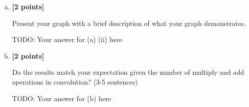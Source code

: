 \begin{enumerate}[(a)]
\begin{tcolorbox}[enhanced jigsaw,breakable,pad at break*=1mm,colback=white!5!white,colframe=green!75!black]
\begin{python}
\end{python}
\end{tcolorbox}
    
    
    \item \textbf{[2 points]}
    \begin{tcolorbox}[colback=orange!5!white,colframe=orange!75!black]
    Present your graph with a brief description of what your graph demonstrates.
    \end{tcolorbox}

\begin{tcolorbox}[colback=white!5!white,colframe=green!75!black]
    \begin{mdframed}
        TODO: Your answer for (a) (ii) here
    \end{mdframed}
\end{tcolorbox}
    

\item \textbf{[2 points]} 
\begin{tcolorbox}[colback=orange!5!white,colframe=orange!75!black]
Do the results match your expectation given the number of multiply and add operations in convolution? (3-5 sentences)
\end{tcolorbox}
    
    \begin{tcolorbox}[colback=white!5!white,colframe=green!75!black]
    \begin{mdframed}
        TODO: Your answer for (b) here
    \end{mdframed}
\end{tcolorbox}
    
\end{enumerate}






